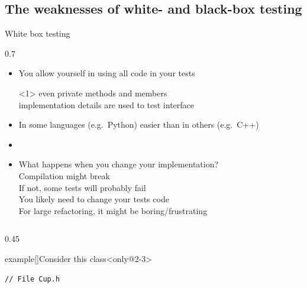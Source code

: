 \subsection[White- and black-box testing!?]{The weaknesses of white- and black-box testing}
\begin{frame}[fragile]{White box testing}
    \vspace{-3mm}
    \begin{overlayarea}{\textwidth}{0.7\textheight}
        \begin{itemize}
            \item You allow yourself in using all code in your tests\\
            \begin{onlyenv}<1>
                \then even private methods and members\\
                \then implementation details are used to test interface
            \end{onlyenv}
            \item<2-> In some languages (e.g.\ Python) easier than in others (e.g.\ C++)
            \item<only@5-> \\
            \item<only@6> \alert{What happens when you change your implementation?}\\
            \then Compilation might break\\
            \then If not, some tests will probably fail\\
            \then You likely need to change your tests code\\
            \then For large refactoring, it might be boring/frustrating\\[3mm]
            \centerline{\Huge{}}
        \end{itemize}
        \begin{columns}[T]
            \begin{column}{0.45\textwidth}
                \begin{varblock}{example}[\textwidth]{Consider this class}<only@2-3>
                    \begin{lstlisting}[style=MyCpp]
                        // File Cup.h


\end{lstlisting}
\end{varblock}
\end{column}
\end{columns}
\end{overlayarea}
\end{frame}
